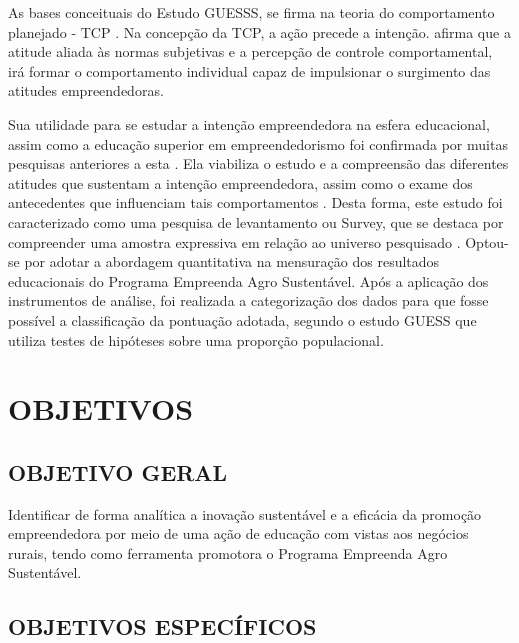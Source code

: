 As bases conceituais do Estudo GUESSS, se firma na teoria do comportamento planejado - TCP \cite{ajzen_perceived_2002}. Na concepção da TCP, a ação precede a intenção.  afirma que a atitude aliada às normas subjetivas e a percepção de controle comportamental, irá formar o comportamento individual capaz de impulsionar o surgimento das atitudes empreendedoras.

Sua utilidade para se estudar a intenção empreendedora na esfera educacional, assim como a educação superior em empreendedorismo foi confirmada por muitas pesquisas anteriores a esta \cite{krueger_potencial_2018,gonzalez_predictors_2009,fayolle_effect_2006}. Ela viabiliza o estudo e a compreensão das diferentes atitudes que sustentam a intenção empreendedora, assim como o exame dos antecedentes que influenciam tais comportamentos \cite{lima_educacao_2014}. Desta forma, este estudo foi caracterizado como uma pesquisa de levantamento ou Survey, que se destaca por compreender uma amostra expressiva em relação ao universo pesquisado \cite{freitas_o_2000}. Optou-se por adotar a abordagem quantitativa na mensuração dos resultados educacionais do Programa Empreenda Agro Sustentável. Após a aplicação dos instrumentos de análise, foi realizada a categorização dos dados para que fosse possível a classificação da pontuação adotada, segundo o estudo GUESS \cite{meoli_how_2019} que utiliza testes de hipóteses sobre uma proporção populacional. 


\newpage

\section{OBJETIVOS}

\subsection{OBJETIVO GERAL}

Identificar de forma analítica a inovação sustentável e a eficácia da promoção empreendedora por meio de uma ação de educação com vistas aos negócios rurais, tendo como ferramenta promotora o Programa Empreenda Agro Sustentável.

\subsection{OBJETIVOS ESPECÍFICOS}

